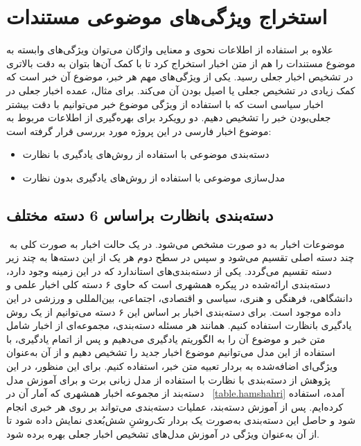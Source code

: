 \section{استخراج ویژگی‌های موضوعی مستندات}
\label{section.cat}
علاوه بر استفاده از اطلاعات نحوی و معنایی واژگان می‌توان ویژگی‌های وابسته به موضوع مستندات را هم از متن اخبار استخراج کرد تا با کمک آن‌ها بتوان به دقت بالاتری در تشخیص اخبار جعلی رسید. یکی از ویژگی‌های مهم هر خبر، موضوع آن خبر است که کمک زیادی در تشخیص جعلی یا اصیل بودن آن‌ می‌کند. برای مثال، عمده اخبار جعلی در اخبار سیاسی است که با استفاده از ویژگی موضوع خبر می‌توانیم با دقت بیشتر جعلی‌بودن خبر را تشخیص دهیم. دو رویکرد برای بهره‌گیری از اطلاعات مربوط به موضوع اخبار فارسی در این پروژه مورد بررسی قرار گرفته است:
\begin{itemize}
	\item دسته‌بندی موضوعی با استفاده از روش‌های یادگیری با نظارت
	\item مدل‌سازی موضوعی با استفاده از روش‌های یادگیری بدون ‌نظارت
\end{itemize}

\subsection{دسته‌بندی بانظارت براساس 6 دسته مختلف}‌
موضوعات اخبار به دو صورت مشخص می‌شود. در یک حالت اخبار به صورت کلی به چند دسته اصلی تقسیم می‌شود و سپس در سطح دوم هر یک از این دسته‌ها به چند زیر دسته تقسیم می‌گردد. یکی از دسته‌بندی‌های استاندارد که در این زمینه وجود دارد، دسته‌بندی ارائه‌شده در پیکره همشهری است \citep{aleahmad2009hamshahri} که حاوی ۶ دسته کلی اخبار علمی و دانشگاهی، فرهنگی و هنری، سیاسی و اقتصادی، اجتماعی، بین‌المللی و ورزشی در این داده موجود است. برای دسته‌بندی اخبار بر اساس این ۶ دسته می‌توانیم از یک روش یادگیری بانظارت استفاده کنیم. همانند هر مسئله دسته‌بندی، مجموعه‌ای از اخبار شامل متن خبر و موضوع آن را به الگوریتم یادگیری می‌دهیم و پس از اتمام یادگیری، با استفاده از این مدل می‌توانیم موضوع اخبار جدید را تشخیص دهیم و از آن به‌عنوان ویژگی‌ای اضافه‌شده به بردار تعبیه متن خبر، استفاده کنیم. برای این منظور، در این پژوهش از دسته‌بندی با نظارت با استفاده از مدل ‌زبانی برت و برای آموزش مدل دسته‌بند از مجموعه اخبار همشهری که آمار آن در \tablename~\ref{table.hamshahri} آمده، ‌استفاده کرده‌ایم.
پس‌ از آموزش دسته‌بند، عملیات دسته‌بندی می‌تواند بر روی هر خبری انجام شود و حاصل این دسته‌بندی به‌صورت یک بردار تک‌روشنِ شش‌بُعدی نمایش داده شود تا از آن به‌عنوان ویژگی در آموزش مدل‌های تشخیص اخبار جعلی بهره برده شود.


